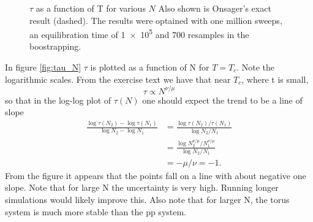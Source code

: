\documentclass{article}
\begin{document}
\begin{figure}[H]
  \centering
  \caption{$\tau$ as a function of T for various $N$
    Also shown is Onsager's exact result (dashed).
    The results were optained with one million sweeps, an equilibration time of \num{1e5} and 700 resamples in the boostrapping.
    \label{fig:tau_T}}
\end{figure}


In figure \ref{fig:tau_N} $\tau$ is plotted as a function of N for $T = T_c$.
Note the logarithmic scales.
From the exercise text we have that near $T_c$, where t is small,
\begin{equation}
  \tau \propto N^{\nu/\mu}
\end{equation}
so that in the log-log plot of $\tau(N)$ one should expect the trend to be a line of slope
\begin{align}
  \frac{\log\tau(N_2) - \log\tau(N_1)}{\log N_2 - \log N_1}
  &= \frac{\log \tau(N_2)/\tau(N_1)}{\log N_2/N_1} \\
  &= \frac{\log N_2^{\nu/\mu}/N_1^{\nu/\mu}}{\log N_2/N_1}\\
  &= -\mu/\nu = -1.
\end{align}
From the figure it appears that the points fall on a line with about negative one slope.
Note that for large N the uncertainty is very high.
Running longer simulations would likely improve this.
Also note that for larger N, the torus system is much more stable than the pp system.
\end{document}
